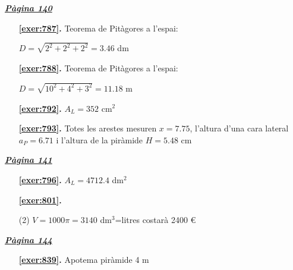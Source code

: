 \hyperlink{page.140}{\textbf{\em Pàgina 140}}
\begin{enumerate}
\item[\fontfamily{phv}\selectfont\color{blue}\textbf{\ref{exer:787}. }] \label{ans:787} 
Teorema de Pitàgores a l'espai:\par $D=\sqrt {2^2+2^2+2^2}=3.46$ dm
 \end{enumerate}
\begin{enumerate}
\item[\fontfamily{phv}\selectfont\color{blue}\textbf{\ref{exer:788}. }] \label{ans:788} 
Teorema de Pitàgores a l'espai:\par $D=\sqrt {10^2+4^2+3^2}=11.18$ m
\item[\fontfamily{phv}\selectfont\color{blue}\textbf{\ref{exer:792}. }] \label{ans:792} 
$A_L=352$ cm$^2$
\item[\fontfamily{phv}\selectfont\color{blue}\textbf{\ref{exer:793}. }] \label{ans:793} 
Totes les arestes mesuren $x=7.75$, l'altura d'una cara lateral $a_P=6.71$ i l'altura de la piràmide $H=5.48$ cm
 \end{enumerate}
\vspace{0.3cm}


\hyperlink{page.141}{\textbf{\em Pàgina 141}}
\begin{enumerate}
\item[\fontfamily{phv}\selectfont\color{blue}\textbf{\ref{exer:796}. }] \label{ans:796} 
$A_L=4712.4$ dm$^2$
 \end{enumerate}
\begin{enumerate}



 \item[\fontfamily{phv}\selectfont\color{blue}\textbf{\ref{exer:801}. }] \label{ans:801}
 \begin{tasks}[column-sep=1em, item-indent=1.3333em](2)
	 \task* $V=1000\pi =3140$ dm$^3$=litres
	 \task costarà 2400 \euro {}
\end{tasks}
 \end{enumerate}
\vspace{0.3cm}


\hyperlink{page.144}{\textbf{\em Pàgina 144}}
\begin{enumerate}
\item[\fontfamily{phv}\selectfont\color{blue}\textbf{\ref{exer:839}. }] \label{ans:839} 
Apotema piràmide 4 m
 \end{enumerate}
\vspace{0.3cm}

